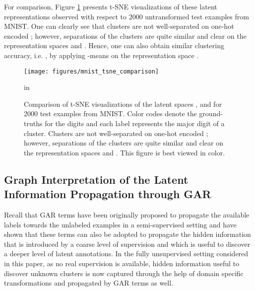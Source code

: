 \documentclass{article} \usepackage{iclr2018_conference,times}
\begin{document}
For comparison, Figure \ref{fig:pseudo_img_tsne_comparison} presents t-SNE visualizations of these latent representations observed with respect to 2000 untransformed test examples from MNIST. One can clearly see that clusters are not well-separated on one-hot encoded ; however, separations of the clusters are quite similar and clear on the representation spaces  and . Hence, one can also obtain similar clustering accuracy, i.e. , by applying -means on the representation space .
\begin{figure}[h]
	\begin{center}
		\centerline{\texttt{[image: figures/mnist\_tsne\_comparison]}}
		\caption{Comparison of t-SNE visualizations of the latent spaces ,  and  for 2000 test examples from MNIST. Color codes denote the ground-truths for the digits and each label represents the major digit of a cluster. Clusters are not well-separated on one-hot encoded ; however, separations of the clusters are quite similar and clear on the representation spaces  and . This figure is best viewed in color.}
		\label{fig:pseudo_img_tsne_comparison}
	\end{center}
	 in
\end{figure}


\subsection{Graph Interpretation of the Latent Information Propagation through GAR}

Recall that GAR terms have been originally proposed to propagate the available labels towards the unlabeled examples in a semi-supervised setting and \citet{KilincU17ACOL} have shown that these terms can also be adopted to propagate the hidden information that is introduced by a coarse level of supervision and which is useful to discover a deeper level of latent annotations. In the fully unsupervised setting considered in this paper, as no real supervision is available, hidden information useful to discover unknown clusters is now captured through the help of domain specific transformations and propagated by GAR terms as well. 
\end{document}
